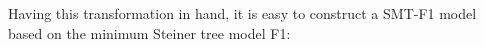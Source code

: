 

Having this transformation in hand, it is easy to construct a SMT-F1 model based on the minimum Steiner tree model F1:

